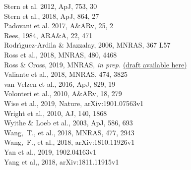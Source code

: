 \documentclass[12pt]{article}
\begin{document}
Stern et al. 2012,  ApJ, 753, 30 \\  %
Stern et al., 2018, ApJ, 864, 27 \\
Padovani et al. 2017, A\&ARv, 25, 2 \\
Rees, 1984, ARA\&A, 22, 471 \\
Rodr{\'{\i}}guez-Ardila \& Mazzalay, 2006, MNRAS, 367 L57 \\
Ross et al., 2018, MNRAS, 480, 4468 \\
Ross \& Cross, 2019, MNRAS, {\it in prep.} \href{https://github.com/d80b2t/VHzQ}{(draft available here)} \\
Valiante et al., 2018, MNRAS,  474, 3825 \\
van Velzen et al., 2016, ApJ, 829, 19 \\
Volonteri  et al., 2010, A\&ARv, 18, 279 \\
Wise et al., 2019, Nature,  arXiv:1901.07563v1 \\
Wright et al., 2010, AJ, 140, 1868 \\
Wyithe \& Loeb et al., 2003, ApJ, 586, 693 \\
Wang,~T., et al., 2018, MNRAS, 477, 2943 \\
Wang,~F., et al., 2018,  arXiv:1810.11926v1 \\
Yan et al., 2019, 1902.04163v1 \\
Yang et al,, 2018, arXiv:1811.11915v1 \\

\end{document}
